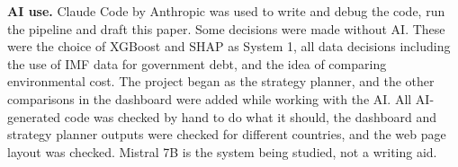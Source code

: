 \documentclass{article}
\begin{document}
\textbf{AI use.} Claude Code by Anthropic was used to write and debug the code, run the pipeline and draft this paper. Some decisions were made without AI. These were the choice of XGBoost and SHAP as System 1, all data decisions including the use of IMF data for government debt, and the idea of comparing environmental cost. The project began as the strategy planner, and the other comparisons in the dashboard were added while working with the AI. All AI-generated code was checked by hand to do what it should, the dashboard and strategy planner outputs were checked for different countries, and the web page layout was checked. Mistral 7B is the system being studied, not a writing aid.

\small


\end{document}
